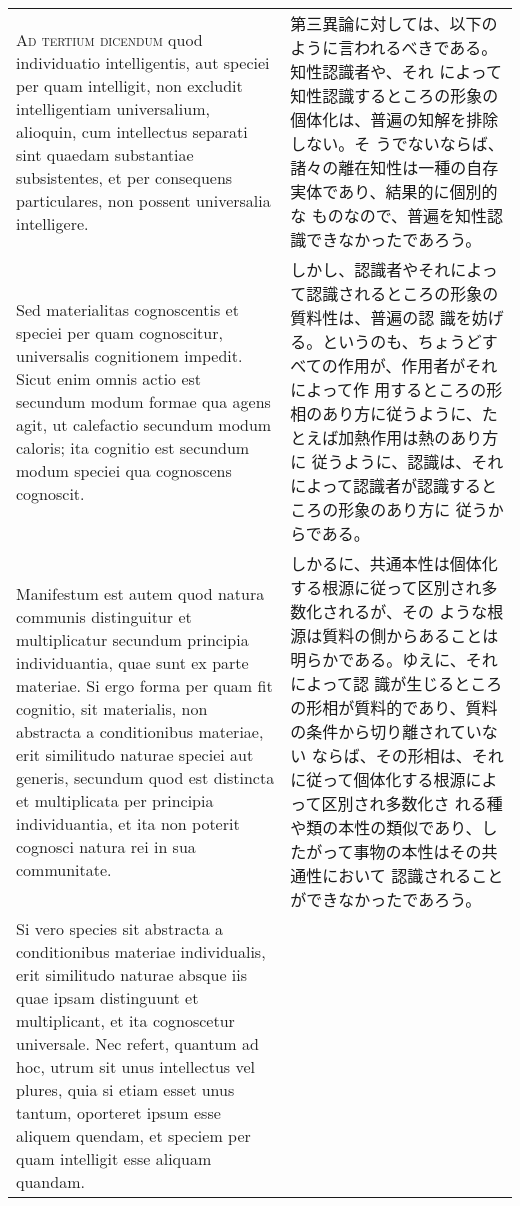 \documentclass[paper=a4paper,fontsize=10pt,jafontsize=9pt,titlepage]{jlreq}
\begin{document}
\begin{longtable}{p{21em}p{21em}}
 {\scshape Ad tertium dicendum} quod individuatio intelligentis, aut
 speciei per quam intelligit, non excludit intelligentiam
 universalium, alioquin, cum intellectus separati sint quaedam
 substantiae subsistentes, et per consequens particulares, non possent
 universalia intelligere.

&

第三異論に対しては、以下のように言われるべきである。知性認識者や、それ
によって知性認識するところの形象の個体化は、普遍の知解を排除しない。そ
うでないならば、諸々の離在知性は一種の自存実体であり、結果的に個別的な
ものなので、普遍を知性認識できなかったであろう。
 
\\


 Sed materialitas cognoscentis et speciei per quam cognoscitur,
 universalis cognitionem impedit. Sicut enim omnis actio est secundum
 modum formae qua agens agit, ut calefactio secundum modum caloris;
 ita cognitio est secundum modum speciei qua cognoscens cognoscit.

&

しかし、認識者やそれによって認識されるところの形象の質料性は、普遍の認
識を妨げる。というのも、ちょうどすべての作用が、作用者がそれによって作
用するところの形相のあり方に従うように、たとえば加熱作用は熱のあり方に
従うように、認識は、それによって認識者が認識するところの形象のあり方に
従うからである。
 
\\

 Manifestum est autem quod natura communis distinguitur et
 multiplicatur secundum principia individuantia, quae sunt ex parte
 materiae. Si ergo forma per quam fit cognitio, sit materialis, non
 abstracta a conditionibus materiae, erit similitudo naturae speciei
 aut generis, secundum quod est distincta et multiplicata per
 principia individuantia, et ita non poterit cognosci natura rei in
 sua communitate.

&

しかるに、共通本性は個体化する根源に従って区別され多数化されるが、その
ような根源は質料の側からあることは明らかである。ゆえに、それによって認
識が生じるところの形相が質料的であり、質料の条件から切り離されていない
ならば、その形相は、それに従って個体化する根源によって区別され多数化さ
れる種や類の本性の類似であり、したがって事物の本性はその共通性において
認識されることができなかったであろう。
 
\\


 Si vero species sit abstracta a conditionibus materiae individualis,
 erit similitudo naturae absque iis quae ipsam distinguunt et
 multiplicant, et ita cognoscetur universale. Nec refert, quantum ad
 hoc, utrum sit unus intellectus vel plures, quia si etiam esset unus
 tantum, oporteret ipsum esse aliquem quendam, et speciem per quam
 intelligit esse aliquam quandam.


\end{longtable}
\end{document}
